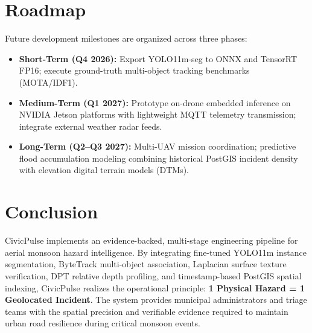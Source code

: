 \documentclass[11pt,a4paper]{article}
\begin{document}
\section{Roadmap}
Future development milestones are organized across three phases:
\begin{itemize}[leftmargin=*]
    \item \textbf{Short-Term (Q4 2026):} Export YOLO11m-seg to ONNX and TensorRT FP16; execute ground-truth multi-object tracking benchmarks (MOTA/IDF1).
    \item \textbf{Medium-Term (Q1 2027):} Prototype on-drone embedded inference on NVIDIA Jetson platforms with lightweight MQTT telemetry transmission; integrate external weather radar feeds.
    \item \textbf{Long-Term (Q2--Q3 2027):} Multi-UAV mission coordination; predictive flood accumulation modeling combining historical PostGIS incident density with elevation digital terrain models (DTMs).
\end{itemize}

\section{Conclusion}
CivicPulse implements an evidence-backed, multi-stage engineering pipeline for aerial monsoon hazard intelligence. By integrating fine-tuned YOLO11m instance segmentation, ByteTrack multi-object association, Laplacian surface texture verification, DPT relative depth profiling, and timestamp-based PostGIS spatial indexing, CivicPulse realizes the operational principle: \textbf{1 Physical Hazard = 1 Geolocated Incident}. The system provides municipal administrators and triage teams with the spatial precision and verifiable evidence required to maintain urban road resilience during critical monsoon events.

\end{document}
